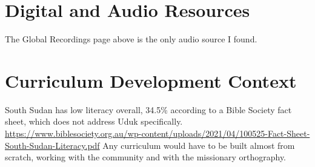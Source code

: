 \documentclass[12pt]{article}
\begin{document}
\section{Digital and Audio Resources}
The Global Recordings page above is the only audio source I found.

\section{Curriculum Development Context}
South Sudan has low literacy overall, 34.5\% according to a Bible Society fact sheet, which does not address Uduk specifically. \url{https://www.biblesociety.org.au/wp-content/uploads/2021/04/100525-Fact-Sheet-South-Sudan-Literacy.pdf}
Any curriculum would have to be built almost from scratch, working with the community and with the missionary orthography.
\end{document}
